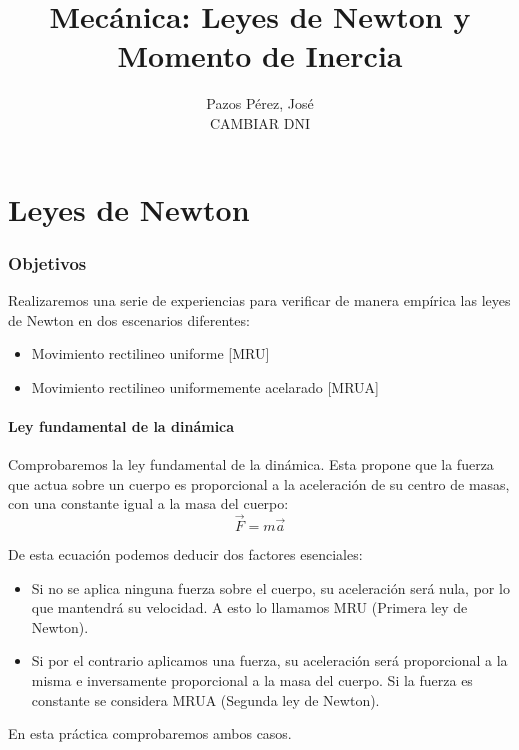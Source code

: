 \documentclass[12pt, a4paper, titlepage]{article}
\title{\textbf {\huge Mecánica: Leyes de Newton y Momento de Inercia}}
\author{{\Large Pazos Pérez, José}\\CAMBIAR DNI}
\date{}
\begin{document}
  \maketitle

  \tableofcontents

  \newpage
  \part{Leyes de Newton}

  \section{Objetivos}

  Realizaremos una serie de experiencias para verificar de manera empírica las leyes de Newton en dos escenarios diferentes:
  \begin{itemize}[label=$-$]
    \item Movimiento rectilineo uniforme [MRU]
    \item Movimiento rectilineo uniformemente acelarado [MRUA]
  \end{itemize}

  \subsection{Ley fundamental de la dinámica}

  Comprobaremos la ley fundamental de la dinámica. Esta propone que la fuerza que actua sobre un cuerpo es proporcional a la aceleración de su centro de masas, con una constante igual a la masa del cuerpo:
  \begin{equation}
    \vec{F} = m \vec{a} \label{ec:newton}
  \end{equation}

  De esta ecuación podemos deducir dos factores esenciales:
  \begin{itemize}[label=$-$]
    \item Si no se aplica ninguna fuerza sobre el cuerpo, su aceleración será nula, por lo que mantendrá su velocidad. A esto lo llamamos MRU (Primera ley de Newton).
    \item Si por el contrario aplicamos una fuerza, su aceleración será proporcional a la misma e inversamente proporcional a la masa del cuerpo. Si la fuerza es constante se considera MRUA (Segunda ley de Newton).
  \end{itemize}

  En esta práctica comprobaremos ambos casos.
\end{document}
